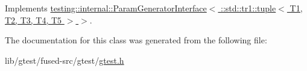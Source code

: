 Implements \hyperlink{classtesting_1_1internal_1_1_param_generator_interface_ae82e6fc79efcef1c794ad333ffb5bf80}{testing\-::internal\-::\-Param\-Generator\-Interface$<$ \-::std\-::tr1\-::tuple$<$ T1, T2, T3, T4, T5 $>$ $>$}.



The documentation for this class was generated from the following file\-:\begin{DoxyCompactItemize}
\item 
lib/gtest/fused-\/src/gtest/\hyperlink{fused-src_2gtest_2gtest_8h}{gtest.\-h}\end{DoxyCompactItemize}
